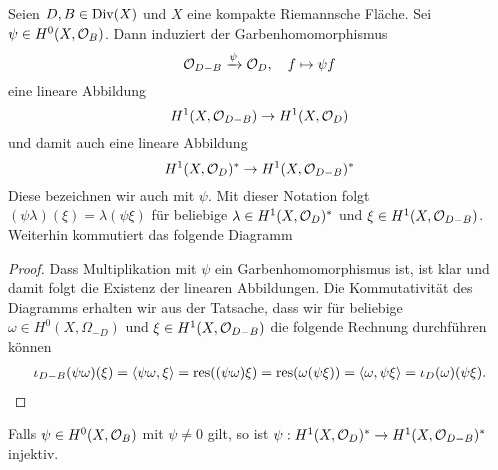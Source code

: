 \begin{lemma}
  Seien $D,B \in \operatorname{Div}(X)$ und $X$ eine kompakte Riemannsche
  Fläche. Sei $\psi \in H^0(X,\mathcal{O}_B)$. Dann induziert der
  Garbenhomomorphismus
  \[
  \mathcal{O}_{D-B} \xrightarrow{\psi} \mathcal{O}_D, \quad f \mapsto \psi f
  \] 
  eine lineare Abbildung
  \[
  H^1(X, \mathcal{O}_{D-B}) \rightarrow H^1(X, \mathcal{O}_D)
  \]
  und damit auch eine lineare Abbildung
  \[
  H^1(X, \mathcal{O}_D)^\ast \rightarrow H^1(X, \mathcal{O}_{D-B})^\ast
  \]
  Diese bezeichnen wir auch mit $\psi$. Mit dieser Notation folgt
  $(\psi \lambda)(\xi) = \lambda(\psi \xi)$ für beliebige $\lambda \in
  H^1(X, \mathcal{O}_D)^\ast$ und $\xi \in H^1(X, \mathcal{O}_{D-B})$. Weiterhin
  kommutiert das folgende Diagramm
  \begin{center}
  \end{center}
\end{lemma}

\begin{proof}
  Dass Multiplikation mit $\psi$ ein Garbenhomomorphismus ist, ist klar
  und damit folgt die Existenz der linearen Abbildungen. Die
  Kommutativität des Diagramms erhalten wir aus der Tatsache, dass wir
  für beliebige $\omega \in H^0(X, \Omega_{-D})$ und $\xi \in H^1(X,
  \mathcal{O}_{D-B})$ die folgende Rechnung durchführen können
  \begin{align*}
    \iota_{D-B}(\psi \omega)(\xi) = \langle \psi \omega, \xi \rangle = \operatorname{res}((\psi
    \omega) \xi) = \operatorname{res}(\omega (\psi \xi)) = \langle \omega, \psi \xi \rangle =
    \iota_D(\omega)(\psi \xi).
  \end{align*}
\end{proof}

\begin{lemma}
  \label{lemma:psi-inj}
  Falls $\psi \in H^0(X, \mathcal{O}_B)$ mit $\psi \neq 0$ gilt, so ist $\psi:
  H^1(X, \mathcal{O}_D)^\ast \rightarrow H^1(X, \mathcal{O}_{D-B})^\ast$ injektiv.
\end{lemma}

